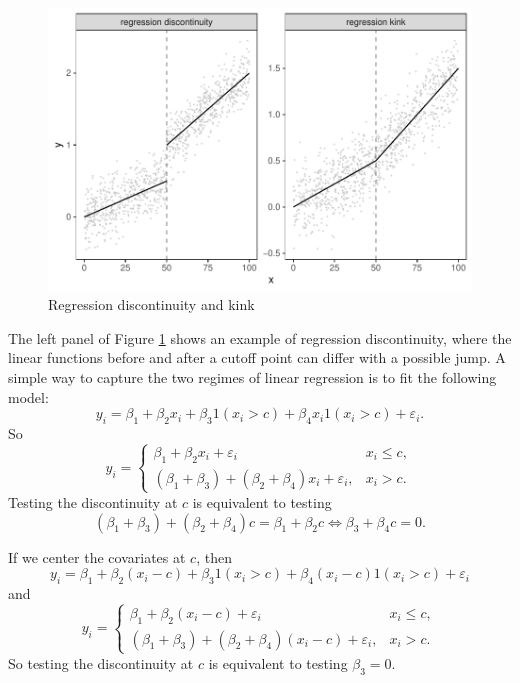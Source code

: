 \begin{figure}
\centering 
\includegraphics[width =  \textwidth]{figures/regressiondiscontinuitykink_ggplot.pdf}

\caption{Regression discontinuity and kink}\label{fig::reg-discon-kink}

\end{figure}


The left panel of Figure \ref{fig::reg-discon-kink} shows an example of regression discontinuity, where the linear functions before and after a cutoff point can differ with a possible jump. A simple way to capture the two regimes of linear regression is to fit the following model: 
\[
y_{i}=\beta_{1}+\beta_{2}x_{i}+\beta_{3}1\left(x_{i}>c\right)+\beta_{4}x_{i}1\left(x_{i}>c\right)+\varepsilon_{i}.
\]
So 
\[
y_{i}=\begin{cases}
\beta_{1}+\beta_{2}x_{i}+\varepsilon_{i} & x_{i}\leq c,\\
\left(\beta_{1}+\beta_{3}\right)+\left(\beta_{2}+\beta_{4}\right)x_{i}+\varepsilon_{i}, & x_{i}>c.
\end{cases}
\]
Testing the discontinuity at $c$ is equivalent to testing
\[
\left(\beta_{1}+\beta_{3}\right)+\left(\beta_{2}+\beta_{4}\right)c=\beta_{1}+\beta_{2}c\Longleftrightarrow\beta_{3}+\beta_{4}c=0.
\]

If we center the covariates at $c$, then 
\[
y_{i}=\beta_{1}+\beta_{2}(x_{i}-c)+\beta_{3}1\left(x_{i}>c\right)+\beta_{4}(x_{i}-c)1\left(x_{i}>c\right)+\varepsilon_{i}
\]
and
\[
y_{i}=\begin{cases}
\beta_{1}+\beta_{2}(x_{i}-c)+\varepsilon_{i} & x_{i}\leq c,\\
\left(\beta_{1}+\beta_{3}\right)+\left(\beta_{2}+\beta_{4}\right)(x_{i}-c)+\varepsilon_{i}, & x_{i}>c.
\end{cases}
\]
So testing the discontinuity at $c$ is equivalent to testing $\beta_{3}=0$. 


